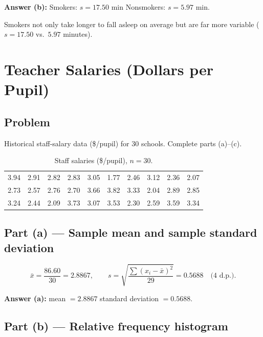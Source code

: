 \documentclass[11pt]{article}
\begin{document}
\begin{answerbox}
\textbf{Answer (b):}\quad
Smokers: $s=17.50$ min \qquad Nonsmokers: $s=5.97$ min.
\end{answerbox}

\noindent
Smokers not only take longer to fall asleep on average but are far more variable
($s=17.50$ vs.\ $5.97$ minutes).


\section{Teacher Salaries (Dollars per Pupil)}

\subsection*{Problem}
Historical staff-salary data (\$/pupil) for $30$ schools. Complete parts (a)–(c).

\begin{table}[H]
\centering
\renewcommand{\arraystretch}{1.2}
\begin{tabular}{*{10}{c}}
\toprule
3.94 & 2.91 & 2.82 & 2.83 & 3.05 & 1.77 & 2.46 & 3.12 & 2.36 & 2.07 \\
2.73 & 2.57 & 2.76 & 2.70 & 3.66 & 3.82 & 3.33 & 2.04 & 2.89 & 2.85 \\
3.24 & 2.44 & 2.09 & 3.73 & 3.07 & 3.53 & 2.30 & 2.59 & 3.59 & 3.34 \\
\bottomrule
\end{tabular}
\caption{Staff salaries (\$/pupil), $n=30$.}
\end{table}

\subsection*{Part (a) — Sample mean and sample standard deviation}
\[
\bar{x}=\frac{86.60}{30}=2.8867,\qquad
s=\sqrt{\frac{\sum (x_i-\bar{x})^2}{29}}=0.5688
\quad\text{(4 d.p.)}.
\]

\begin{answerbox}
\textbf{Answer (a):}\quad
mean $=2.8867$ \qquad standard deviation $=0.5688$.
\end{answerbox}

\subsection*{Part (b) — Relative frequency histogram}
\end{document}
